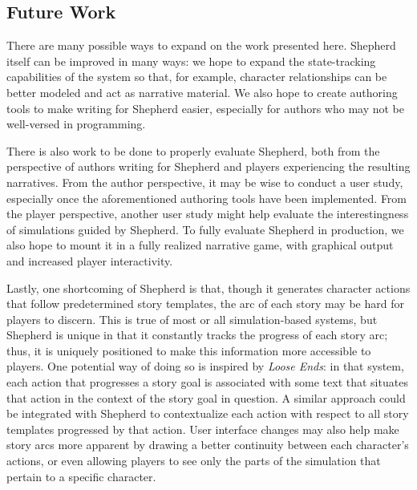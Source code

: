 \documentclass[letterpaper]{article}
\begin{document}
\subsection{Future Work}
There are many possible ways to expand on the work presented here. Shepherd itself can be
improved in many ways: we hope to expand the state-tracking capabilities of the system so
that, for example, character relationships can be better modeled and act as narrative
material. We also hope to create authoring tools to make writing for Shepherd easier,
especially for authors who may not be well-versed in programming. 

There is also work to be done to properly evaluate Shepherd, both from the perspective of
authors writing for Shepherd and players experiencing the resulting narratives. From the
author perspective, it may be wise to conduct a user study, especially once the
aforementioned authoring tools have been implemented. From the player perspective, another
user study might help evaluate the interestingness of simulations guided by Shepherd. To
fully evaluate Shepherd in production, we also hope to mount it in a fully realized
narrative game, with graphical output and increased player interactivity. 

Lastly, one shortcoming of Shepherd is that, though it generates character actions that
follow predetermined story templates, the arc of each story may be hard for players to
discern. This is true of most or all simulation-based systems, but Shepherd is unique in
that it constantly tracks the progress of each story arc; thus, it is uniquely positioned
to make this information more accessible to players. One potential way of doing so is
inspired by \textit{Loose Ends}: in that system, each action that progresses a story goal
is associated with some text that situates that action in the context of the story goal in
question. A similar approach could be integrated with Shepherd to contextualize each
action with respect to all story templates progressed by that action. User interface
changes may also help make story arcs more apparent by drawing a better continuity between
each character's actions, or even allowing players to see only the parts of the simulation
that pertain to a specific character.


\end{document}
